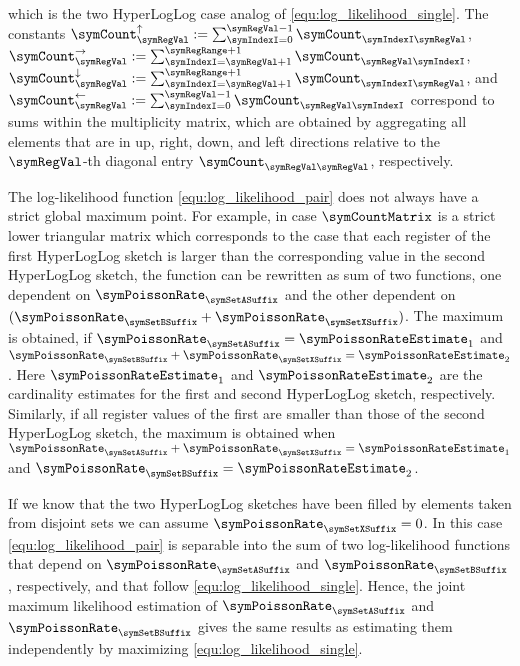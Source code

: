 \documentclass[11pt]{article} %
\begin{document}
which is the two HyperLogLog case analog of \eqref{equ:log_likelihood_single}.
The constants $\symCount^\uparrow_\symRegVal:=\sum_{\symIndexI=0}^{\symRegVal-1} \symCount_{\symIndexI\symRegVal}$, $\symCount^\rightarrow_\symRegVal:=\sum_{\symIndexI=\symRegVal+1}^{\symRegRange+1} \symCount_{\symRegVal\symIndexI}$, $\symCount^\downarrow_\symRegVal:=\sum_{\symIndexI=\symRegVal+1}^{\symRegRange+1} \symCount_{\symIndexI\symRegVal}$, and $\symCount^\leftarrow_\symRegVal:=\sum_{\symIndexI=0}^{\symRegVal-1} \symCount_{\symRegVal\symIndexI}$ correspond to sums within the multiplicity matrix, which are obtained by aggregating all elements that are in up, right, down, and left directions relative to the $\symRegVal$-th diagonal entry  $\symCount_{\symRegVal\symRegVal}$, respectively.

The log-likelihood function \eqref{equ:log_likelihood_pair} does not always have a strict global maximum point. For example, in case $\symCountMatrix$ is a strict lower triangular matrix which corresponds to the case that each register of the first HyperLogLog sketch is larger than the corresponding value in the second HyperLogLog sketch, the function can be rewritten as sum of two functions, one dependent on $\symPoissonRate_\symSetASuffix$ and the other dependent on $(\symPoissonRate_\symSetBSuffix+\symPoissonRate_\symSetXSuffix)$. 
The maximum is obtained, if $\symPoissonRate_\symSetASuffix = \symPoissonRateEstimate_1$ and $\symPoissonRate_\symSetBSuffix+\symPoissonRate_\symSetXSuffix = \symPoissonRateEstimate_2$. Here $\symPoissonRateEstimate_1$ and $\symPoissonRateEstimate_2$ are the cardinality estimates for the first and second HyperLogLog sketch, respectively. Similarly, if all register values of the first are smaller than those of the second HyperLogLog sketch, the maximum is obtained when 
$\symPoissonRate_\symSetASuffix+\symPoissonRate_\symSetXSuffix = \symPoissonRateEstimate_1$ and $\symPoissonRate_\symSetBSuffix = \symPoissonRateEstimate_2$.

If we know that the two HyperLogLog sketches have been filled by elements taken from disjoint sets we can assume $\symPoissonRate_\symSetXSuffix=0$. In this case \eqref{equ:log_likelihood_pair} is separable into the sum of two log-likelihood functions that depend on $\symPoissonRate_\symSetASuffix$ and $\symPoissonRate_\symSetBSuffix$, respectively, and that follow \eqref{equ:log_likelihood_single}. Hence, the joint maximum likelihood estimation of $\symPoissonRate_\symSetASuffix$ and $\symPoissonRate_\symSetBSuffix$ gives the same results as estimating them independently by maximizing \eqref{equ:log_likelihood_single}.
\end{document}
